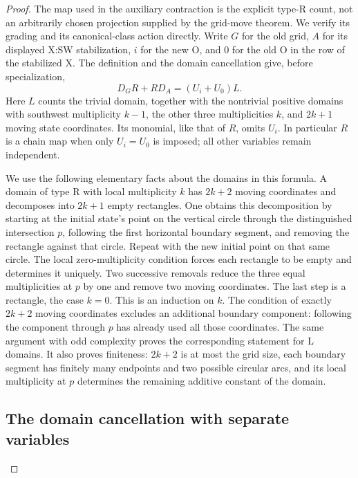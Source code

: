 \documentclass[11pt,a4paper]{article}
\theoremstyle{remark}
\begin{document}
\begin{proof}

The map used in the auxiliary contraction is the explicit type-R count,
not an arbitrarily chosen projection supplied by the grid-move theorem.
We verify its grading and its canonical-class action directly.  Write
$G$ for the old grid, $A$ for its displayed X:SW stabilization, $i$ for
the new O, and $0$ for the old O in the row of the stabilized X.  The
definition and the domain cancellation give, before specialization,
\begin{equation}\label{eq:R-full-variable-identity}
 D_G R+R D_A=(U_i+U_0)L.
\end{equation}
Here $L$ counts the trivial domain, together with the nontrivial
positive domains with southwest multiplicity $k-1$, the other three
multiplicities $k$, and $2k+1$ moving state coordinates.  Its monomial,
like that of $R$, omits $U_i$.  In particular $R$ is a chain map when
only $U_i=U_0$ is imposed; all other variables remain independent.

We use the following elementary facts about the domains in this formula.
A domain of type R with local multiplicity $k$ has $2k+2$ moving
coordinates and decomposes into $2k+1$ empty rectangles.  One obtains
this decomposition by starting at the initial state's point on the
vertical circle through the distinguished intersection $p$, following
the first horizontal boundary segment, and removing the rectangle
against that circle.  Repeat with the new initial point on that same
circle.  The local zero-multiplicity condition forces each rectangle to
be empty and determines it uniquely.  Two successive removals reduce
the three equal multiplicities at $p$ by one and remove two moving
coordinates.  The last step is a rectangle, the case $k=0$.  This is
an induction on $k$.  The condition of exactly $2k+2$ moving coordinates
excludes an additional boundary component: following the component
through $p$ has already used all those coordinates.  The same argument
with odd complexity proves the corresponding statement for L domains.
It also proves finiteness: $2k+2$ is at most the grid size, each boundary
segment has finitely many endpoints and two possible circular arcs,
and its local multiplicity at $p$ determines the remaining additive
constant of the domain.

\subsection{The domain cancellation with separate variables}


\end{proof}
\end{document}
